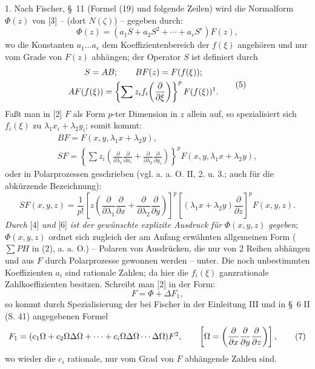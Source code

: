 \documentclass[11pt]{article}
\providecommand{\p}{\partial}
\begin{document}
1. Nach Fischer, \S~11 (Formel (19) und folgende Zeilen) wird die Normalform $\Phi(z)$ von [3] -- (dort $N(\zeta)$) -- gegeben durch:
\begin{equation}
        \Phi(z)=(a_1S+a_2S^2+\cdots+a_rS^r)F(z),
\tag{4}
\end{equation}
wo die Konstanten $a_1\ldots a_r$ dem Koeffizientenbereich der $f(\xi)$ angehören und nur vom Grade von $F(z)$ abhängen; der Operator $S$ ist definiert durch
\begin{equation}
\begin{gathered}
        S=AB;\qquad BF(z)=F(f(\xi));\\
        AF(f(\xi))=\left\{\sum z_i f_i\!\left(\frac{\p}{\p\xi}\right)\right\}^{p}F(f(\xi))\footnotemark.
\end{gathered}
\tag{5}
\end{equation}
Faßt man in [2] $F$ als Form $p$-ter Dimension in $z$ allein auf, so spezialisiert sich $f_i(\xi)$ zu $\lambda_1x_i+\lambda_2y_i$; somit kommt:
\[
\begin{gathered}
        BF=F(x,y,\lambda_1x+\lambda_2y),\\
        SF=\left\{\sum z_i\left(\frac{\p}{\p\lambda_1}\frac{\p}{\p x_i}+
        \frac{\p}{\p\lambda_2}\frac{\p}{\p y_i}\right)\right\}^{p}
        F(x,y,\lambda_1x+\lambda_2y),
\end{gathered}
\]
oder in Polarprozessen geschrieben (vgl. a. a. O. II, 2. u. 3.; auch für die abkürzende Bezeichnung):
\begin{equation}
        SF(x,y,z)=\frac1{p!}\left[z\left(\frac{\p}{\p\lambda_1}\frac{\p}{\p x}+
        \frac{\p}{\p\lambda_2}\frac{\p}{\p y}\right)\right]^p
        \left[(\lambda_1x+\lambda_2y)\frac{\p}{\p z}\right]^p F(x,y,z).
\tag{6}
\end{equation}
\emph{Durch} [4] \emph{und} [6] \emph{ist der gewünschte explizite Ausdruck für} $\Phi(x,y,z)$ \emph{gegeben}; $\Phi(x,y,z)$ ordnet sich zugleich der am Anfang erwähnten allgemeinen Form ($\sum PH$ in (2), a. a. O.) -- Polaren von Ausdrücken, die nur von 2 Reihen abhängen und aus $F$ durch Polarprozesse gewonnen werden -- unter. Die noch unbestimmten Koeffizienten $a_i$ sind rationale Zahlen; da hier die $f_i(\xi)$ ganzrationale Zahlkoeffizienten besitzen. Schreibt man [2] in der Form:
\begin{equation}
        F=\Phi+\Delta F_1,
\tag{2a}
\end{equation}
so kommt durch Spezialisierung der bei Fischer in der Einleitung III und in \S~6 II (S. 41) angegebenen Formel
\begin{equation}
        F_1=(c_1\Omega+c_2\Omega\Delta\Omega+\cdots+c_i\Omega\Delta\Omega\cdots\Delta\Omega)F\footnotemark,
        \qquad \left[\Omega=\left(\frac{\p}{\p x}\frac{\p}{\p y}\frac{\p}{\p z}\right)\right],
\tag{7}
\end{equation}
wo wieder die $c_i$ rationale, nur vom Grad von $F$ abhängende Zahlen sind.
\end{document}
